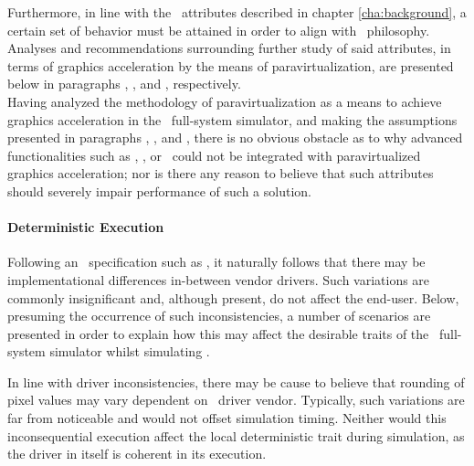 Furthermore, in line with the \dvttermsimics\ attributes described in chapter \ref{cha:background}, a certain set of behavior must be attained in order to align with \dvttermsimics\ philosophy.
Analyses and recommendations surrounding further study of said attributes, in terms of graphics acceleration by the means of paravirtualization, are presented below in paragraphs , , and , respectively.\\

\noindent
Having analyzed the methodology of paravirtualization as a means to achieve graphics acceleration in the \dvttermsimics\ full-system simulator, and making the assumptions presented in paragraphs , , and , there is no obvious obstacle as to why advanced functionalities such as \dvttermdeterministicexecution , \dvttermcheckpointing , or \dvttermreverseexecution\ could not be integrated with paravirtualized graphics acceleration; nor is there any reason to believe that such attributes should severely impair performance of such a solution.

\paragraph{Deterministic Execution}
\label{par:discussion_deterministicexecution}
Following an \dvttermapi\ specification such as \dvttermopengles , it naturally follows that there may be implementational differences in-between vendor drivers.
Such variations are commonly insignificant and, although present, do not affect the end-user.
Below, presuming the occurrence of such inconsistencies, a number of scenarios are presented in order to explain how this may affect the desirable traits of the \dvttermsimics\ full-system simulator whilst simulating \dvttermopengles .

In line with driver inconsistencies, there may be cause to believe that rounding of pixel values may vary dependent on \dvttermhost\ driver vendor.
Typically, such variations are far from noticeable and would not offset simulation timing.
Neither would this inconsequential execution affect the local deterministic trait during simulation, as the driver in itself is coherent in its execution.

